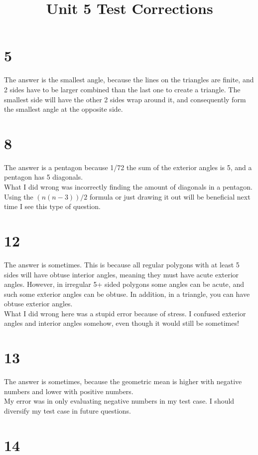 \documentclass{article}
\begin{document}
	
	\setlength{\droptitle}{-5em}
	\title{Unit 5 Test Corrections}
	\date{}
	\author{}
	\maketitle
	
	\section*{5}
	The answer is the smallest angle, because the lines on the triangles are finite, and 2 sides have to be larger combined than the last one to create a triangle. The smallest side will have the other 2 sides wrap around it, and consequently form the smallest angle at the opposite side.
	\section*{8}
	The answer is a pentagon because 1/72 the sum of the exterior angles is 5, and a pentagon has 5 diagonals. \\
	What I did wrong was incorrectly finding the amount of diagonals in a pentagon. Using the $(n(n-3))/2$ formula or just drawing it out will be beneficial next time I see this type of question. \\
	\section*{12}
	The answer is sometimes. This is because all regular polygons with at least 5 sides will have obtuse interior angles, meaning they must have acute exterior angles. However, in irregular 5+ sided polygons some angles can be acute, and such some exterior angles can be obtuse. In addition, in a triangle, you can have obtuse exterior angles. \\
	What I did wrong here was a stupid error because of stress. I confused exterior angles and interior angles somehow, even though it would still be sometimes! \\
	\section*{13}
	The answer is sometimes, because the geometric mean is higher with negative numbers and lower with positive numbers. \\
	My error was in only evaluating negative numbers in my test case. I should diversify my test case in future questions.
	\section*{14}
	
\end{document}
